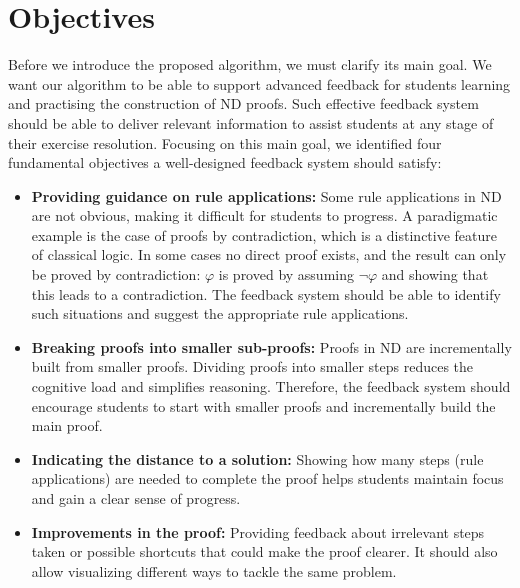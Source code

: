 \section{Objectives}\label{sec:requirements}
Before we introduce the proposed algorithm, we must clarify its main goal. We want our algorithm to be able to support advanced feedback for students learning and practising the construction of ND proofs. Such effective feedback system should be able to deliver relevant information to assist students at any stage of their exercise resolution. Focusing on this main goal, we identified four fundamental objectives a well-designed feedback system should satisfy:

\begin{itemize}

\item \textbf {Providing guidance on rule applications:} Some rule applications in ND are not obvious, making it difficult for students to progress. A paradigmatic example is the case of proofs by contradiction, which is a distinctive feature of classical logic. In some cases no direct proof exists, and the result can only be proved by contradiction: \(\varphi\) is proved by assuming \(\neg \varphi\) and showing that this leads to a contradiction. The feedback system should be able to identify such situations and suggest the appropriate rule applications.

\item \textbf {Breaking proofs into smaller sub-proofs:} Proofs in ND are incrementally built from smaller proofs. Dividing proofs into smaller steps reduces the cognitive load and simplifies reasoning. Therefore, the feedback system should encourage students to start with smaller proofs and incrementally build the main proof. 

\item \textbf{Indicating the distance to a solution:} Showing how many steps (rule applications) are needed to complete the proof helps students maintain focus and gain a clear sense of progress.

\item \textbf{Improvements in the proof:} Providing feedback about irrelevant steps taken or possible shortcuts that could make the proof clearer. It should also allow visualizing different ways to tackle the same problem.

\end{itemize}
